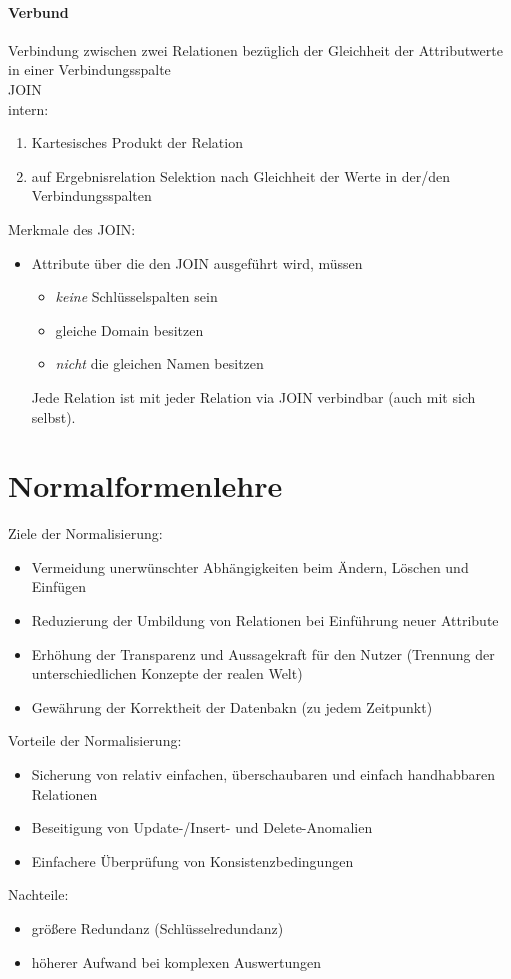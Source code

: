 \paragraph{Verbund} Verbindung zwischen zwei Relationen bezüglich der Gleichheit der Attributwerte in einer Verbindungsspalte\\
JOIN\\
intern:
\begin{enumerate}
\item Kartesisches Produkt der Relation
\item auf Ergebnisrelation Selektion nach Gleichheit der Werte in der/den Verbindungsspalten
\end{enumerate}
Merkmale des JOIN:
\begin{itemize}
\item Attribute über die den JOIN ausgeführt wird, müssen
\begin{itemize}
\item \emph{keine} Schlüsselspalten sein
\item gleiche Domain besitzen
\item \emph{nicht} die gleichen Namen besitzen
\end{itemize}
Jede Relation ist mit jeder Relation via JOIN verbindbar (auch mit sich selbst).
\end{itemize}

\section{Normalformenlehre}
Ziele der Normalisierung:
\begin{itemize}
\item Vermeidung unerwünschter Abhängigkeiten beim Ändern, Löschen und Einfügen
\item Reduzierung der Umbildung von Relationen bei Einführung neuer Attribute
\item Erhöhung der Transparenz und Aussagekraft für den Nutzer (Trennung der unterschiedlichen Konzepte der realen Welt)
\item Gewährung der Korrektheit der Datenbakn (zu jedem Zeitpunkt)
\end{itemize}
Vorteile der Normalisierung:
\begin{itemize}
\item Sicherung von relativ einfachen, überschaubaren und einfach handhabbaren Relationen
\item Beseitigung von Update-/Insert- und Delete-Anomalien
\item Einfachere Überprüfung von Konsistenzbedingungen
\end{itemize}
Nachteile:
\begin{itemize}
\item größere Redundanz (Schlüsselredundanz)
\item höherer Aufwand bei komplexen Auswertungen
\end{itemize}
